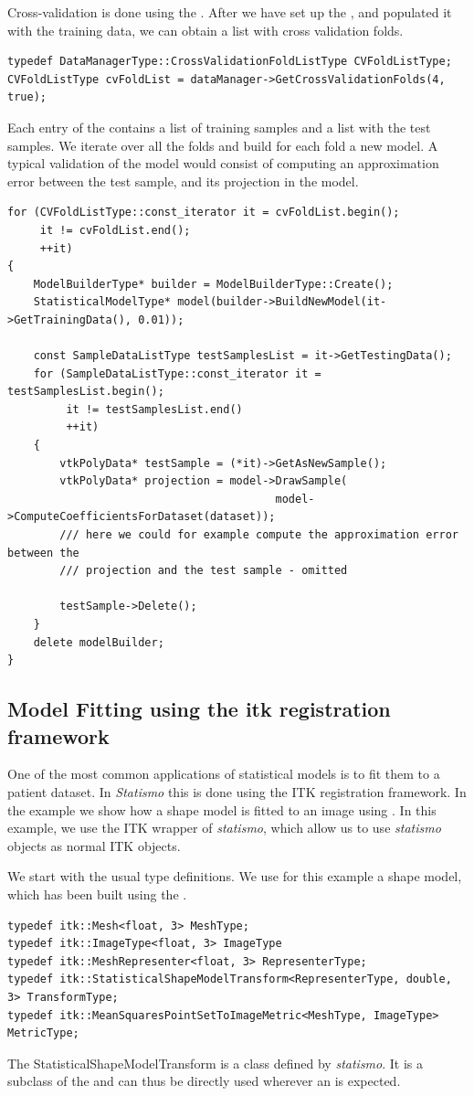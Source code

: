 \documentclass{InsightArticle}
\newcommand{\statismo}{\emph{statismo}\xspace}
\newcommand{\Statismo}{\emph{Statismo}\xspace}
\begin{document}
Cross-validation is done using the . 
After we have set up the , and populated it with the training data, we 
can obtain a list with cross validation folds. 
\begin{verbatim}
typedef DataManagerType::CrossValidationFoldListType CVFoldListType;
CVFoldListType cvFoldList = dataManager->GetCrossValidationFolds(4, true);
\end{verbatim}
Each entry of the  contains a list of training samples and a list with the test samples. 
We iterate over all the folds and build for each fold a new model. A typical validation of the model would 
consist of computing an approximation error between the test sample, and its projection in the model. 
\begin{verbatim}
for (CVFoldListType::const_iterator it = cvFoldList.begin();
     it != cvFoldList.end();
     ++it)
{
    ModelBuilderType* builder = ModelBuilderType::Create();
    StatisticalModelType* model(builder->BuildNewModel(it->GetTrainingData(), 0.01));

    const SampleDataListType testSamplesList = it->GetTestingData();
    for (SampleDataListType::const_iterator it = testSamplesList.begin();
         it != testSamplesList.end()
         ++it)
    {
        vtkPolyData* testSample = (*it)->GetAsNewSample();
        vtkPolyData* projection = model->DrawSample(
                                         model->ComputeCoefficientsForDataset(dataset));
        /// here we could for example compute the approximation error between the 
        /// projection and the test sample - omitted

        testSample->Delete();
    }
    delete modelBuilder;
}

\end{verbatim}

\subsection{Model Fitting using the itk registration framework}\label{sec:model-fitting}
One of the most common applications of statistical models is to fit them to a patient dataset. 
In \Statismo this is done using the ITK registration framework. In the example 
we show how a shape model is fitted to an image using . 
In this example, we use the ITK wrapper of \statismo, which allow us to use \statismo objects as normal ITK objects.

We start with the usual type definitions. We use for this example a shape model, which has been 
built using the . 
\begin{verbatim}
typedef itk::Mesh<float, 3> MeshType;
typedef itk::ImageType<float, 3> ImageType
typedef itk::MeshRepresenter<float, 3> RepresenterType;
typedef itk::StatisticalShapeModelTransform<RepresenterType, double, 3> TransformType;
typedef itk::MeanSquaresPointSetToImageMetric<MeshType, ImageType> MetricType;
\end{verbatim}
The StatisticalShapeModelTransform is a class defined by \statismo. It is a subclass of the 
and can thus be directly used wherever an  is expected. 
\end{document}
